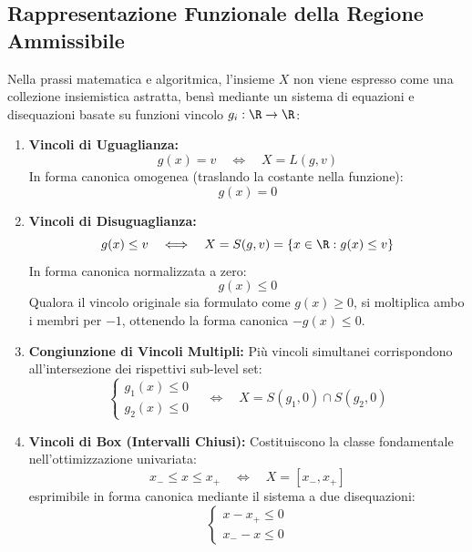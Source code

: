 \subsection{Rappresentazione Funzionale della Regione Ammissibile}
Nella prassi matematica e algoritmica, l'insieme $X$ non viene espresso come una collezione insiemistica astratta, bens\`i mediante un sistema di equazioni e disequazioni basate su funzioni vincolo $g_i: \R \to \R$:
\begin{enumerate}
    \item \textbf{Vincoli di Uguaglianza:}
    \begin{equation}
    g(x) = v \quad \Longleftrightarrow \quad X = L(g, v)
    \end{equation}
    In forma canonica omogenea (traslando la costante nella funzione):
    \begin{equation}
    g(x) = 0
    \end{equation}
    \item \textbf{Vincoli di Disuguaglianza:}
    \begin{equation}
    g(x) \le v \quad \Longleftrightarrow \quad X = S(g, v) = \{ x \in \R : g(x) \le v \}
    \end{equation}
    In forma canonica normalizzata a zero:
    \begin{equation}
    g(x) \le 0
    \end{equation}
    Qualora il vincolo originale sia formulato come $g(x) \ge 0$, si moltiplica ambo i membri per $-1$, ottenendo la forma canonica $-g(x) \le 0$.
    \item \textbf{Congiunzione di Vincoli Multipli:}
    Pi\`u vincoli simultanei corrispondono all'intersezione dei rispettivi sub-level set:
    \begin{equation}
    \begin{cases} g_1(x) \le 0 \\ g_2(x) \le 0 \end{cases} \quad \Longleftrightarrow \quad X = S(g_1, 0) \cap S(g_2, 0)
    \end{equation}
    \item \textbf{Vincoli di Box (Intervalli Chiusi):}
    Costituiscono la classe fondamentale nell'ottimizzazione univariata:
    \begin{equation}
    x_- \le x \le x_+ \quad \Longleftrightarrow \quad X = [x_-, x_+]
    \end{equation}
    esprimibile in forma canonica mediante il sistema a due disequazioni:
    \begin{equation}
    \begin{cases} x - x_+ \le 0 \\ x_- - x \le 0 \end{cases}
    \end{equation}
\end{enumerate}


